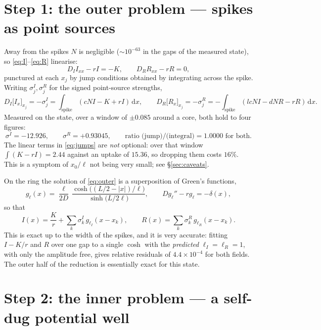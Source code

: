\documentclass[11pt,a4paper]{article}
\newcommand{\lI}{\ell_I}
\newcommand{\lR}{\ell_R}
\newcommand{\xj}{x_j}
\newcommand{\dd}{\,\mathrm{d}}
\theoremstyle{plain}
\theoremstyle{remark}
\begin{document}
\section{Step 1: the outer problem --- spikes as point sources}

Away from the spikes $N$ is negligible ($\sim 10^{-63}$ in the gaps of the
measured state), so \eqref{eq:I}--\eqref{eq:R} linearise:
\begin{equation}
  D_I I_{xx} - rI = -K, \qquad D_R R_{xx} - rR = 0 ,
\label{eq:outer}
\end{equation}
punctured at each $\xj$ by jump conditions obtained by integrating across the
spike. Writing $\sigma^{I}_j, \sigma^{R}_j$ for the signed point-source
strengths,
\begin{equation}
  D_I\big[I_x\big]_{\xj} = -\sigma^I_j = \int_{\text{spike}} \!\!(cNI - K + rI)\dd x,
  \qquad
  D_R\big[R_x\big]_{\xj} = -\sigma^R_j = -\!\!\int_{\text{spike}}\!\! (lcNI - dNR - rR)\dd x .
\label{eq:jumps}
\end{equation}
Measured on the state, over a window of $\pm 0.085$ around a core, both hold to
four figures:
\[
  \sigma^I = -12.926, \qquad \sigma^R = +0.93045, \qquad
  \text{ratio (jump)/(integral)} = 1.0000 \text{ for both.}
\]
The linear terms in \eqref{eq:jumps} are \emph{not} optional: over that window
$\int(K-rI) = 2.44$ against an uptake of $15.36$, so dropping them costs $16\%$.
This is a symptom of $x_0/\ell$ not being very small; see \S\ref{sec:caveats}.

On the ring the solution of \eqref{eq:outer} is a superposition of Green's
functions,
\begin{equation}
  g_\ell(x) = \frac{\ell}{2D}\,
  \frac{\cosh\!\big((L/2 - |x|)/\ell\big)}{\sinh\!\big(L/2\ell\big)},
  \qquad D g_\ell'' - r g_\ell = -\delta(x),
\end{equation}
so that
\begin{equation}
  I(x) = \frac{K}{r} + \sum_k \sigma^I_k\, g_{\lI}(x - x_k),
  \qquad
  R(x) = \sum_k \sigma^R_k\, g_{\lR}(x - x_k).
\label{eq:outerfields}
\end{equation}
This is exact up to the width of the spikes, and it is very accurate: fitting
$I - K/r$ and $R$ over one gap to a single $\cosh$ with the \emph{predicted}
$\lI = \lR = 1$, with only the amplitude free, gives relative residuals of
$4.4\times10^{-4}$ for both fields. The outer half of the reduction is
essentially exact for this state.

\section{Step 2: the inner problem --- a self-dug potential well}
\end{document}
